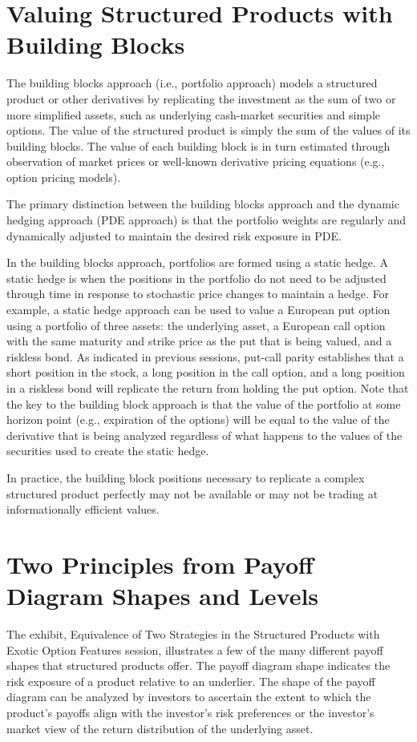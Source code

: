 \documentclass[11pt]{article}
\begin{document}
\section*{Valuing Structured Products with Building Blocks}
The building blocks approach (i.e., portfolio approach) models a structured product or other derivatives by replicating the investment as the sum of two or more simplified assets, such as underlying cash-market securities and simple options. The value of the structured product is simply the sum of the values of its building blocks. The value of each building block is in turn estimated through observation of market prices or well-known derivative pricing equations (e.g., option pricing models).

The primary distinction between the building blocks approach and the dynamic hedging approach (PDE approach) is that the portfolio weights are regularly and dynamically adjusted to maintain the desired risk exposure in PDE.

In the building blocks approach, portfolios are formed using a static hedge. A static hedge is when the positions in the portfolio do not need to be adjusted through time in response to stochastic price changes to maintain a hedge. For example, a static hedge approach can be used to value a European put option using a portfolio of three assets: the underlying asset, a European call option with the same maturity and strike price as the put that is being valued, and a riskless bond. As indicated in previous sessions, put-call parity establishes that a short position in the stock, a long position in the call option, and a long position in a riskless bond will replicate the return from holding the put option. Note that the key to the building block approach is that the value of the portfolio at some horizon point (e.g., expiration of the options) will be equal to the value of the derivative that is being analyzed regardless of what happens to the values of the securities used to create the static hedge.

In practice, the building block positions necessary to replicate a complex structured product perfectly may not be available or may not be trading at informationally efficient values.

\section*{Two Principles from Payoff Diagram Shapes and Levels}
The exhibit, Equivalence of Two Strategies in the Structured Products with Exotic Option Features session, illustrates a few of the many different payoff shapes that structured products offer. The payoff diagram shape indicates the risk exposure of a product relative to an underlier. The shape of the payoff diagram can be analyzed by investors to ascertain the extent to which the product's payoffs align with the investor's risk preferences or the investor's market view of the return distribution of the underlying asset.
\end{document}

